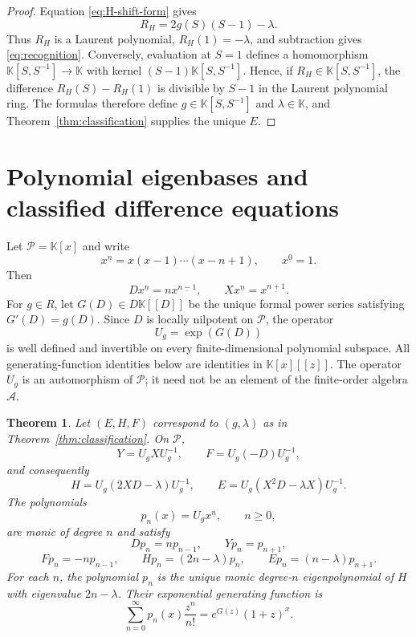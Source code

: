 \documentclass[11pt,reqno]{amsart}
\numberwithin{equation}{section}
\newtheorem{theorem}{Theorem}[section]
\theoremstyle{definition}
\theoremstyle{remark}
\newcommand{\K}{\mathbb K}
\newcommand{\algA}{\mathcal A}
\newcommand{\calP}{\mathcal P}
\begin{document}
\begin{proof}
Equation \eqref{eq:H-shift-form} gives
\[
 R_H=2g(S)(S-1)-\lambda.
\]
Thus $R_H$ is a Laurent polynomial, $R_H(1)=-\lambda$, and subtraction gives \eqref{eq:recognition}.  Conversely, evaluation at $S=1$ defines a homomorphism $\K[S,S^{-1}]\to\K$ with kernel $(S-1)\K[S,S^{-1}]$.  Hence, if $R_H\in\K[S,S^{-1}]$, the difference $R_H(S)-R_H(1)$ is divisible by $S-1$ in the Laurent polynomial ring.  The formulas therefore define $g\in\K[S,S^{-1}]$ and $\lambda\in\K$, and Theorem~\ref{thm:classification} supplies the unique $E$.
\end{proof}

\section{Polynomial eigenbases and classified difference equations}

Let $\calP=\K[x]$ and write
\[
 x^{\underline n}=x(x-1)\cdots(x-n+1),
 \qquad
 x^{\underline0}=1.
\]
Then
\[
 D x^{\underline n}=n x^{\underline{n-1}},
 \qquad
 Xx^{\underline n}=x^{\underline{n+1}}.
\]
For $g\in R$, let $G(D)\in D\K[[D]]$ be the unique formal power series satisfying $G'(D)=g(D)$.  Since $D$ is locally nilpotent on $\calP$, the operator
\[
 U_g=\exp(G(D))
\]
is well defined and invertible on every finite-dimensional polynomial subspace.  All generating-function identities below are identities in $\K[x][[z]]$.  The operator $U_g$ is an automorphism of $\calP$; it need not be an element of the finite-order algebra $\algA$.

\begin{theorem}\label{thm:eigenbasis}
Let $(E,H,F)$ correspond to $(g,\lambda)$ as in Theorem~\ref{thm:classification}.  On $\calP$,
\[
 Y=U_gXU_g^{-1},
 \qquad
 F=U_g(-D)U_g^{-1},
\]
and consequently
\[
 H=U_g(2XD-\lambda)U_g^{-1},
 \qquad
 E=U_g(X^2D-\lambda X)U_g^{-1}.
\]
The polynomials
\[
 p_n(x)=U_gx^{\underline n},
 \qquad n\ge0,
\]
are monic of degree $n$ and satisfy
\begin{equation}\label{eq:basis-actions}
 Dp_n=np_{n-1},
 \qquad
 Yp_n=p_{n+1},
\end{equation}
\begin{equation}\label{eq:sl2-actions}
 Fp_n=-np_{n-1},
 \qquad
 Hp_n=(2n-\lambda)p_n,
 \qquad
 Ep_n=(n-\lambda)p_{n+1}.
\end{equation}
For each $n$, the polynomial $p_n$ is the unique monic degree-$n$ eigenpolynomial of $H$ with eigenvalue $2n-\lambda$.  Their exponential generating function is
\begin{equation}\label{eq:egf}
 \sum_{n=0}^{\infty}p_n(x)\frac{z^n}{n!}
 =e^{G(z)}(1+z)^x.
\end{equation}
\end{theorem}
\end{document}
